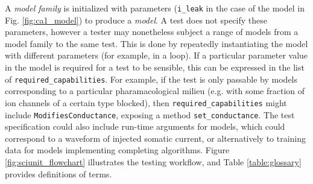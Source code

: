 \documentclass[11pt,letterpaper]{article}
\begin{document}
A \textit{model family} is initialized with parameters (\verb|i_leak| in the case of the model in Fig. \ref{fig:ca1_model}) to produce a \textit{model}.  A test does not specify these parameters, however a tester may nonetheless subject a range of models from a model family to the same test.  This is done by repeatedly instantiating the model with different parameters (for example, in a loop).  If a particular parameter value in the model is required for a test to be sensible, this can be expressed in the list of \verb|required_capabilities|.  For example, if the test is only passable by models corresponding to a particular pharamacological milieu (e.g. with some fraction of ion channels of a certain type blocked), then \verb|required_capabilities| might include \verb|ModifiesConductance|, exposing a method \verb|set_conductance|.  The test specification could also include run-time arguments for models, which could correspond to a waveform of injected somatic current, or alternatively to training data for models implementing completing algorithms.  Figure \ref{fig:sciunit_flowchart} illustrates the testing workflow, and Table \ref{table:glossary} provides definitions of terms.  
 
\end{document}
